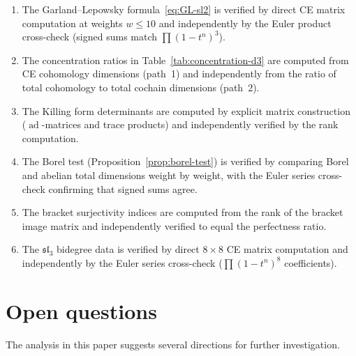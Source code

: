 \documentclass[11pt,reqno]{amsart}
\theoremstyle{plain}
\theoremstyle{definition}
\theoremstyle{remark}
\DeclareMathOperator{\ad}{ad}
\begin{document}
\begin{enumerate}[label=(\arabic*)]
 \item The Garland--Lepowsky formula~\eqref{eq:GL-sl2} is verified by
 direct CE matrix computation at weights $w \le 10$ and independently by
 the Euler product cross-check (signed sums match $\prod(1-t^n)^3$).

 \item The concentration ratios in Table~\ref{tab:concentration-d3} are
 computed from CE cohomology dimensions (path~1) and independently from
 the ratio of total cohomology to total cochain dimensions (path~2).

 \item The Killing form determinants are computed by explicit matrix
 construction ($\ad$-matrices and trace products) and independently verified
 by the rank computation.

 \item The Borel test (Proposition~\ref{prop:borel-test}) is verified by
 comparing Borel and abelian total dimensions weight by weight, with the
 Euler series cross-check confirming that signed sums agree.

 \item The bracket surjectivity indices are computed from the rank of
 the bracket image matrix and independently verified to equal the
 perfectness ratio.

 \item The $\mathfrak{sl}_3$ bidegree data is verified by direct $8
 \times 8$ CE matrix computation and independently by the Euler series
 cross-check ($\prod(1-t^n)^8$ coefficients).
\end{enumerate}


\section{Open questions}
\label{sec:open}

The analysis in this paper suggests several directions for further
investigation.
\end{document}
